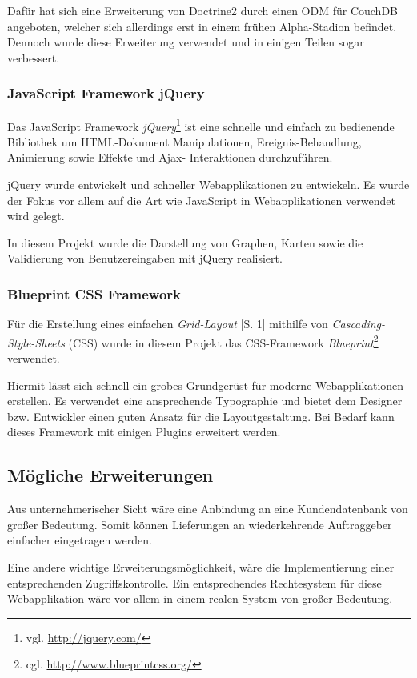 Dafür hat sich eine Erweiterung von Doctrine2 durch einen ODM für CouchDB
	angeboten, welcher sich allerdings erst in einem frühen Alpha-Stadion befindet.
	Dennoch wurde diese Erweiterung verwendet und in einigen Teilen sogar
	verbessert.

\subsubsection{JavaScript Framework jQuery}
Das JavaScript Framework \emph{jQuery}\footnote{vgl. \url{http://jquery.com/}}
	ist eine schnelle und einfach zu bedienende Bibliothek um HTML-Dokument
	Manipulationen,	Ereignis-Behandlung, Animierung sowie Effekte und Ajax-
	Interaktionen durchzuführen.
	
jQuery wurde entwickelt und schneller Webapplikationen zu entwickeln. Es wurde der
	Fokus vor allem auf die Art wie JavaScript in Webapplikationen verwendet wird
	gelegt.
	
In diesem Projekt wurde die Darstellung von Graphen, Karten sowie die Validierung von
	Benutzereingaben mit jQuery realisiert.

\subsubsection{Blueprint CSS Framework}
Für die Erstellung eines einfachen \emph{Grid-Layout} \cite{W3C11}[S. 1] mithilfe von
	\emph{Cascading-Style-Sheets} (CSS) wurde in diesem Projekt das CSS-Framework
	\emph{Blueprint}\footnote{cgl. \url{http://www.blueprintcss.org/}} verwendet.
	
Hiermit lässt sich schnell ein grobes Grundgerüst für moderne Webapplikationen
	erstellen. Es verwendet eine ansprechende Typographie und bietet dem Designer
	bzw. Entwickler einen guten Ansatz für die Layoutgestaltung. Bei Bedarf kann
	dieses Framework mit einigen Plugins erweitert werden.

\subsection{Mögliche Erweiterungen}

Aus unternehmerischer Sicht wäre eine Anbindung an eine Kundendatenbank von
	großer Bedeutung. Somit können Lieferungen an wiederkehrende Auftraggeber
	einfacher eingetragen werden.
	
Eine andere wichtige Erweiterungsmöglichkeit, wäre die Implementierung einer
	entsprechenden Zugriffskontrolle. Ein entsprechendes Rechtesystem für diese
	Webapplikation wäre vor allem in einem realen System von großer Bedeutung.

